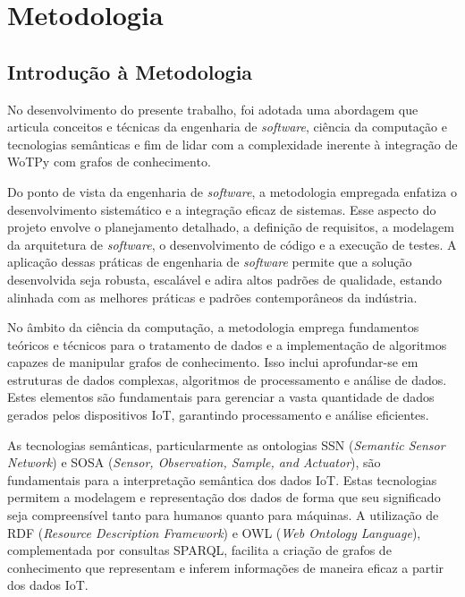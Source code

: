 \chapter{Metodologia}

\section{Introdução à Metodologia}

No desenvolvimento do presente trabalho, foi adotada uma abordagem que articula conceitos e técnicas da engenharia de \textit{software}, ciência da computação e tecnologias semânticas e fim de lidar com a complexidade inerente à integração de WoTPy com grafos de conhecimento. 


Do ponto de vista da engenharia de \textit{software}, a metodologia empregada enfatiza o desenvolvimento sistemático e a integração eficaz de sistemas. Esse aspecto do projeto envolve o planejamento detalhado, a definição de requisitos, a modelagem da arquitetura de \textit{software}, o desenvolvimento de código e a execução de testes. A aplicação dessas práticas de engenharia de \textit{software} permite que a solução desenvolvida seja robusta, escalável e adira altos padrões de qualidade, estando alinhada com as melhores práticas e padrões contemporâneos da indústria.

 No âmbito da ciência da computação, a metodologia emprega fundamentos teóricos e técnicos para o tratamento de dados e a implementação de algoritmos capazes de manipular grafos de conhecimento. Isso inclui aprofundar-se em estruturas de dados complexas, algoritmos de processamento e análise de dados. Estes elementos são fundamentais para gerenciar a vasta quantidade de dados gerados pelos dispositivos IoT, garantindo processamento e análise eficientes.

As tecnologias semânticas, particularmente as ontologias SSN (\textit{Semantic Sensor Network}) e SOSA (\textit{Sensor, Observation, Sample, and Actuator}), são fundamentais para a interpretação semântica dos dados IoT. Estas tecnologias permitem a modelagem e representação dos dados de forma que seu significado seja compreensível tanto para humanos quanto para máquinas. A utilização de RDF (\textit{Resource Description Framework}) e OWL (\textit{Web Ontology Language}), complementada por consultas SPARQL, facilita a criação de grafos de conhecimento que representam e inferem informações de maneira eficaz a partir dos dados IoT.

